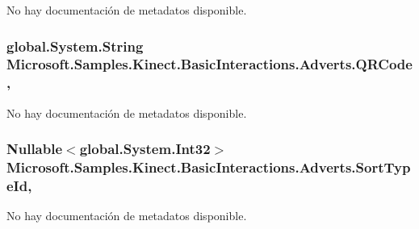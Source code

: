 No hay documentación de metadatos disponible. 

\hypertarget{class_microsoft_1_1_samples_1_1_kinect_1_1_basic_interactions_1_1_adverts_a2d91bc840239c541da939e7d0877b8ff}{
\subsubsection[{Q\-R\-Code}]{\setlength{\rightskip}{0pt plus 5cm}global.\-System.\-String Microsoft.\-Samples.\-Kinect.\-Basic\-Interactions.\-Adverts.\-Q\-R\-Code\hspace{0.3cm}{\ttfamily [get]}, {\ttfamily [set]}}}\label{class_microsoft_1_1_samples_1_1_kinect_1_1_basic_interactions_1_1_adverts_a2d91bc840239c541da939e7d0877b8ff}


No hay documentación de metadatos disponible. 

\hypertarget{class_microsoft_1_1_samples_1_1_kinect_1_1_basic_interactions_1_1_adverts_a7038889daa495680752d091fc01c123d}{
\subsubsection[{Sort\-Type\-Id}]{\setlength{\rightskip}{0pt plus 5cm}Nullable$<$global.\-System.\-Int32$>$ Microsoft.\-Samples.\-Kinect.\-Basic\-Interactions.\-Adverts.\-Sort\-Type\-Id\hspace{0.3cm}{\ttfamily [get]}, {\ttfamily [set]}}}\label{class_microsoft_1_1_samples_1_1_kinect_1_1_basic_interactions_1_1_adverts_a7038889daa495680752d091fc01c123d}


No hay documentación de metadatos disponible. 

